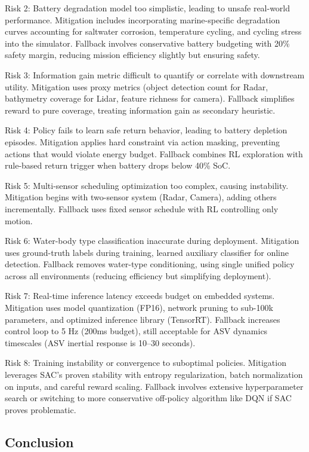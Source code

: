Risk 2: Battery degradation model too simplistic, leading to unsafe real-world performance. Mitigation includes incorporating marine-specific degradation curves accounting for saltwater corrosion, temperature cycling, and cycling stress into the simulator. Fallback involves conservative battery budgeting with 20\% safety margin, reducing mission efficiency slightly but ensuring safety.

Risk 3: Information gain metric difficult to quantify or correlate with downstream utility. Mitigation uses proxy metrics (object detection count for Radar, bathymetry coverage for Lidar, feature richness for camera). Fallback simplifies reward to pure coverage, treating information gain as secondary heuristic.

Risk 4: Policy fails to learn safe return behavior, leading to battery depletion episodes. Mitigation applies hard constraint via action masking, preventing actions that would violate energy budget. Fallback combines RL exploration with rule-based return trigger when battery drops below 40\% SoC.

Risk 5: Multi-sensor scheduling optimization too complex, causing instability. Mitigation begins with two-sensor system (Radar, Camera), adding others incrementally. Fallback uses fixed sensor schedule with RL controlling only motion.

Risk 6: Water-body type classification inaccurate during deployment. Mitigation uses ground-truth labels during training, learned auxiliary classifier for online detection. Fallback removes water-type conditioning, using single unified policy across all environments (reducing efficiency but simplifying deployment).

Risk 7: Real-time inference latency exceeds budget on embedded systems. Mitigation uses model quantization (FP16), network pruning to sub-100k parameters, and optimized inference library (TensorRT). Fallback increases control loop to 5 Hz (200ms budget), still acceptable for ASV dynamics timescales (ASV inertial response is 10--30 seconds).

Risk 8: Training instability or convergence to suboptimal policies. Mitigation leverages SAC's proven stability with entropy regularization, batch normalization on inputs, and careful reward scaling. Fallback involves extensive hyperparameter search or switching to more conservative off-policy algorithm like DQN if SAC proves problematic.

\subsection{Conclusion}

